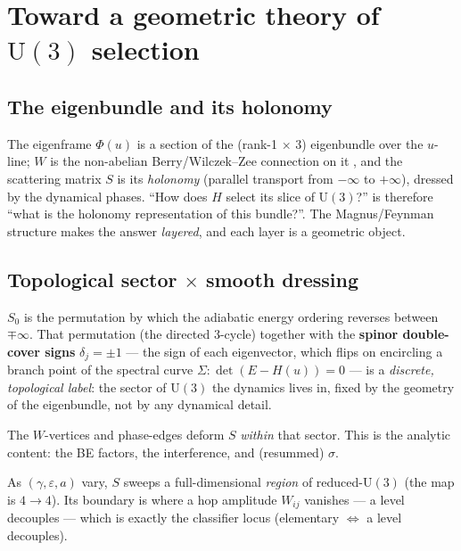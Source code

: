 \documentclass[11pt]{article}
\newcommand{\eps}{\varepsilon}
\newcommand{\U}{\mathrm{U}}
\begin{document}
\section{Toward a geometric theory of $\U(3)$ selection}\label{sec:geometry}

\subsection{The eigenbundle and its holonomy}
The eigenframe $\Phi(u)$ is a section of the (rank-1$\,\times\,3$) eigenbundle over the $u$-line; $W$ is the
non-abelian Berry/Wilczek--Zee connection on it \cite{Berry1984,WilczekZee1984}, and the scattering matrix
$S$ is its \emph{holonomy} (parallel transport from $-\infty$ to $+\infty$), dressed by the dynamical
phases. ``How does $H$ select its slice of $\U(3)$?'' is therefore ``what is the holonomy representation of
this bundle?''. The Magnus/Feynman structure makes the answer \emph{layered}, and each layer is a geometric
object.

\subsection{Topological sector $\times$ smooth dressing}
\begin{description}[leftmargin=1.4em]
\item[Order $0$ --- a topological datum.] $S_0$ is the permutation by which the adiabatic energy ordering
reverses between $\mp\infty$. That permutation (the directed $3$-cycle) together with the \textbf{spinor
double-cover signs} $\delta_j=\pm1$ --- the sign of each eigenvector, which flips on encircling a branch
point of the spectral curve $\Sigma:\det(E-H(u))=0$ --- is a \emph{discrete, topological label}: the sector
of $\U(3)$ the dynamics lives in, fixed by the geometry of the eigenbundle, not by any dynamical detail.
\item[Higher orders --- the smooth dressing.] The $W$-vertices and phase-edges deform $S$ \emph{within}
that sector. This is the analytic content: the BE factors, the interference, and (resummed) $\sigma$.
\item[The boundary.] As $(\gamma,\eps,a)$ vary, $S$ sweeps a full-dimensional \emph{region} of
reduced-$\U(3)$ (the map is $4\to4$). Its boundary is where a hop amplitude $W_{ij}$ vanishes --- a level
decouples --- which is exactly the classifier locus (elementary $\Leftrightarrow$ a level decouples).
\end{description}
\end{document}
